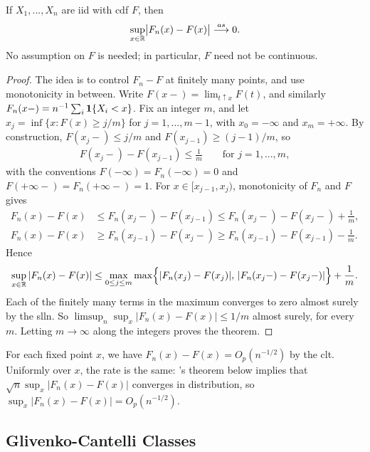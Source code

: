 \documentclass[a4paper,12pt]{article}
\begin{document}
\begin{theorem}\label{thm-gc}
	If $X_1,...,X_n$ are \gls{iid} with \gls{cdf} $F$, then
	\begin{align}
		\sup_{x\in\mathbb{R}}\bigl|F_n(x)-F(x)\bigr|\overset{as}{\longrightarrow}0.
	\end{align}
	No assumption on $F$ is needed; in particular, $F$ need not be continuous.
\end{theorem}
\begin{proof}
	The idea is to control $F_n-F$ at finitely many points, and use monotonicity in between.
	Write $F(x-)=\lim_{t\uparrow x}F(t)$, and similarly $F_n(x-)=n^{-1}\sum_i\mathbf{1}\{X_i<x\}$.
	Fix an integer $m$, and let $x_j=\inf\{x:F(x)\ge j/m\}$ for $j=1,...,m-1$, with $x_0=-\infty$ and $x_m=+\infty$.
	By construction, $F(x_j-)\le j/m$ and $F(x_{j-1})\ge(j-1)/m$, so
	\begin{align*}
		F(x_j-)-F(x_{j-1})\le\frac1m
		\qquad\text{for }j=1,...,m,
	\end{align*}
	with the conventions $F(-\infty)=F_n(-\infty)=0$ and $F(+\infty-)=F_n(+\infty-)=1$.
	For $x\in[x_{j-1},x_j)$, monotonicity of $F_n$ and $F$ gives
	\begin{align*}
		F_n(x)-F(x)&\le F_n(x_j-)-F(x_{j-1})\le F_n(x_j-)-F(x_j-)+\frac1m,\\
		F_n(x)-F(x)&\ge F_n(x_{j-1})-F(x_j-)\ge F_n(x_{j-1})-F(x_{j-1})-\frac1m.
	\end{align*}
	Hence
	\begin{align*}
		\sup_{x\in\mathbb{R}}|F_n(x)-F(x)|
		\le\max_{0\le j\le m}\max\Bigl\{|F_n(x_j)-F(x_j)|,\,|F_n(x_j-)-F(x_j-)|\Bigr\}+\frac1m.
	\end{align*}
	Each of the finitely many terms in the maximum converges to zero almost surely by the \gls{slln}.
	So $\limsup_n\sup_x|F_n(x)-F(x)|\le1/m$ almost surely, for every $m$.
	Letting $m\to\infty$ along the integers proves the theorem.
\end{proof}

\begin{remark}
	For each fixed point $x$, we have $F_n(x)-F(x)=O_p(n^{-1/2})$ by the \gls{clt}.
	Uniformly over $x$, the rate is the same:
	's theorem below implies that $\sqrt n\sup_x|F_n(x)-F(x)|$ converges in distribution,
	so $\sup_x|F_n(x)-F(x)|=O_p(n^{-1/2})$.
\end{remark}

\subsection{Glivenko-Cantelli Classes}
\end{document}
